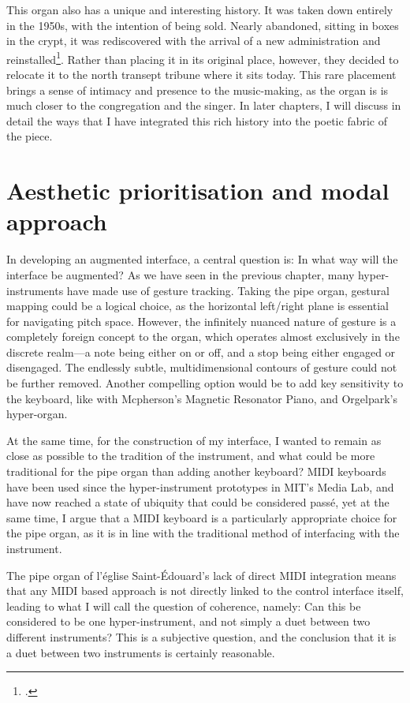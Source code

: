 \documentclass[12pt,twoside,maitrise]{dms_ks}
\theoremstyle{definition}
\begin{document}
{This organ also has a unique and interesting history. 
It was taken down entirely in the 1950s, with the intention of being sold. 
Nearly abandoned, sitting in boxes in the crypt, it was rediscovered with the arrival of a new administration and reinstalled\footcite{noauthor_eglise_nodate}. 
Rather than placing it in its original place, however, they decided to relocate it to the north transept tribune where it sits today. 
This rare placement brings a sense of intimacy and presence to the music-making, as the organ is is much closer to the congregation and the singer. 
In later chapters, I will discuss in detail the ways that I have integrated this rich history into the poetic fabric of the piece.

\section{Aesthetic prioritisation and modal approach}

In developing an augmented interface, a central question is: In what way will the interface be augmented?
As we have seen in the previous chapter, many hyper-instruments have made use of gesture tracking.
Taking the pipe organ, gestural mapping could be a logical choice, as the horizontal left/right plane is essential for navigating pitch space.
However, the infinitely nuanced nature of gesture is a completely foreign concept to the organ, which operates almost exclusively in the discrete realm---a note being either on or off, and a stop being either engaged or disengaged.
The endlessly subtle, multidimensional contours of gesture could not be further removed.
Another compelling option would be to add key sensitivity to the keyboard, like with Mcpherson's Magnetic Resonator Piano, and Orgelpark's hyper-organ. 

At the same time, for the construction of my interface, I wanted to remain as close as possible to the tradition of the instrument, and what could be more traditional for the pipe organ than adding another keyboard?
MIDI keyboards have been used since the hyper-instrument prototypes in MIT's Media Lab, and have now reached a state of ubiquity that could be considered passé, yet at the same time, I argue that a MIDI keyboard is a particularly appropriate choice for the pipe organ, as it is in line with the traditional method of interfacing with the instrument.

The pipe organ of l'église Saint-Édouard's lack of direct MIDI integration means that any MIDI based approach is not directly linked to the control interface itself, leading to what I will call the question of coherence, namely: Can this be considered to be one hyper-instrument, and not simply a duet between two different instruments?
This is a subjective question, and the conclusion that it is a duet between two instruments is certainly reasonable.

}
\end{document}

